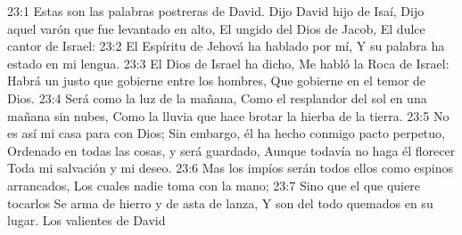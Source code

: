 23:1 Estas son las palabras postreras de David. 
Dijo David hijo de Isaí,  
Dijo aquel varón que fue levantado en alto,  
El ungido del Dios de Jacob,  
El dulce cantor de Israel:  
23:2 El Espíritu de Jehová ha hablado por mí,  
Y su palabra ha estado en mi lengua.  
23:3 El Dios de Israel ha dicho,  
Me habló la Roca de Israel:  
Habrá un justo que gobierne entre los hombres,  
Que gobierne en el temor de Dios.  
23:4 Será como la luz de la mañana,  
Como el resplandor del sol en una mañana sin nubes,  
Como la lluvia que hace brotar la hierba de la tierra.  
23:5 No es así mi casa para con Dios;  
Sin embargo, él ha hecho conmigo pacto perpetuo,  
Ordenado en todas las cosas, y será guardado,  
Aunque todavía no haga él florecer  
Toda mi salvación y mi deseo.  
23:6 Mas los impíos serán todos ellos como espinos arrancados,  
Los cuales nadie toma con la mano;  
23:7 Sino que el que quiere tocarlos  
Se arma de hierro y de asta de lanza,  
Y son del todo quemados en su lugar. 
Los valientes de David  
 
